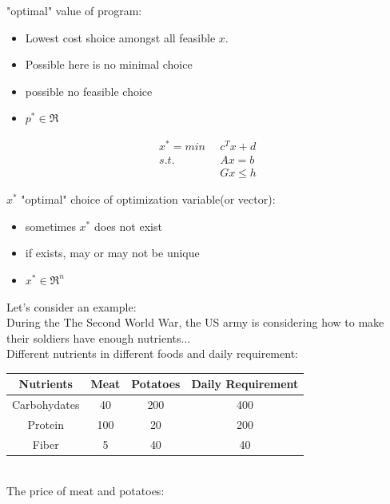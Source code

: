 "optimal" value of program:

\begin{itemize}
	\item Lowest cost shoice amongst all feasible $x$.
	
	\item Possible here is no minimal choice
	
	\item possible no feasible choice
	
	\item $p^*\in \Re$
\end{itemize}


\begin{align*}
x^* = min \,\,\, &c^Tx + d\\
s.t.\,\,\, &Ax = b\\
&Gx\leq h
\end{align*}

$x^*$ "optimal" choice of optimization variable(or vector):

\begin{itemize}
	\item sometimes $x^*$ does not exist
	
	\item if exists, may or may not be unique
	
	\item $x^*\in \Re^n$
\end{itemize}


Let's consider an example:\\

During the The Second World War, the US army is considering how to make their soldiers have enough nutrients...\\

Different nutrients in different foods and daily requirement:\\


\begin{tabular}{|c|c|c|c|}
	\hline 
	Nutrients&Meat&Potatoes&Daily Requirement\\
	\hline  
	Carbohydates&40&200&400\\
	\hline  
	Protein&100&20&200\\
	\hline  
	Fiber&5&40&40\\
	\hline 
\end{tabular}\\

The price of meat and potatoes:\\



